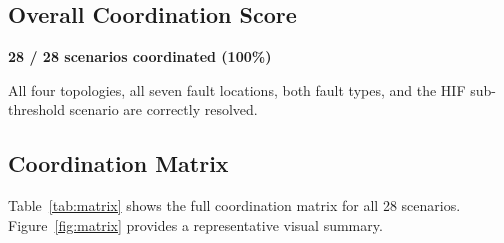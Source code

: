 \documentclass[11pt, a4paper]{article}
\begin{document}
\subsection{Overall Coordination Score}

\begin{center}
\Large
\textbf{\textcolor{okgreen}{28 / 28 scenarios coordinated (100\%)}}
\end{center}

All four topologies, all seven fault locations, both fault types, and the HIF
sub-threshold scenario are correctly resolved.

\subsection{Coordination Matrix}

Table~\ref{tab:matrix} shows the full coordination matrix for all 28 scenarios.
Figure~\ref{fig:matrix} provides a representative visual summary.
\end{document}
